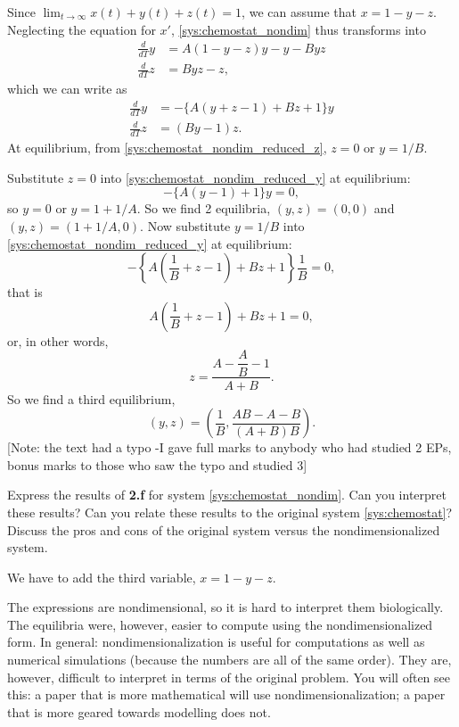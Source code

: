\documentclass[12pt]{article}
\theoremstyle{plain}
\begin{document}
Since $\lim_{t\to\infty} x(t)+y(t)+z(t)=1$, we can assume that $x=1-y-z$. Neglecting the equation for $x'$, \eqref{sys:chemostat_nondim} thus transforms into
\begin{align*}
\frac{d}{dT} y &= A(1-y-z)y-y-Byz \\
\frac{d}{dT} z &= Byz-z,
\end{align*}
which we can write as
\begin{subequations}\label{sys:chemostat_nondim_reduced}
\begin{align}
\frac{d}{dT} y &= -\{A(y+z-1)+Bz+1\}y \label{sys:chemostat_nondim_reduced_y} \\
\frac{d}{dT} z &= (By-1)z. \label{sys:chemostat_nondim_reduced_z}
\end{align}
\end{subequations}
At equilibrium, from \eqref{sys:chemostat_nondim_reduced_z}, $z=0$ or $y=1/B$.

Substitute $z=0$ into \eqref{sys:chemostat_nondim_reduced_y} at equilibrium:
\[
-\{A(y-1)+1\}y=0,
\]
so $y=0$ or $y=1+1/A$. So we find 2 equilibria, $(y,z)=(0,0)$ and $(y,z)=(1+1/A,0)$. Now substitute $y=1/B$ into \eqref{sys:chemostat_nondim_reduced_y} at equilibrium:
\[
-\left\{A\left(\frac 1B+z-1\right)+Bz+1\right\}\frac 1B=0,
\]
that is
\[
A\left(\frac 1B+z-1\right)+Bz+1=0,
\]
or, in other words,
\[
z=\frac{A-\dfrac AB-1}{A+B}.
\]
So we find a third equilibrium, 
\[
(y,z)=\left(\frac 1B,\frac{AB-A-B}{(A+B)B}\right).
\]
[Note: the text had a typo -I gave full marks to anybody who had studied 2 EPs, bonus marks to those who saw the typo and studied 3]





Express the results of {\bf 2.f} for system \eqref{sys:chemostat_nondim}. Can you interpret these results? Can you relate these results to the original system \eqref{sys:chemostat}? Discuss the pros and cons of the original system versus the nondimensionalized system.

We have to add the third variable, $x=1-y-z$.

The expressions are nondimensional, so it is hard to interpret them biologically. The equilibria were, however, easier to compute using the nondimensionalized form. In general: nondimensionalization is useful for computations as well as numerical simulations (because the numbers are all of the same order). They are, however, difficult to interpret in terms of the original problem. You will often see this: a paper that is more mathematical will use nondimensionalization; a paper that is more geared towards modelling does not.
\end{document}
